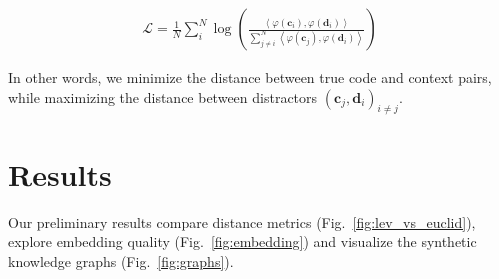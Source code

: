 \documentclass[11pt]{article}
\begin{document}
\begin{align}
  \mathcal{L} = \frac{1}{N}\sum_i^N \log\left(\frac{\left<\varphi(\mathbf{c}_i), \varphi(\mathbf{d}_i)\right>}{\sum_{j \neq i}^N \left<\varphi(\mathbf{c}_j), \varphi(\mathbf{d}_i)\right>}\right)
\end{align}

In other words, we minimize the distance between true code and context pairs, while maximizing the distance between distractors $(\mathbf c_j, \mathbf d_i)_{i \neq j}$.

%
%

\section{Results}\label{sec:results}

Our preliminary results compare distance metrics (Fig.~\ref{fig:lev_vs_euclid}), explore embedding quality (Fig.~\ref{fig:embedding}) and visualize the synthetic knowledge graphs (Fig.~\ref{fig:graphs}).
\end{document}
